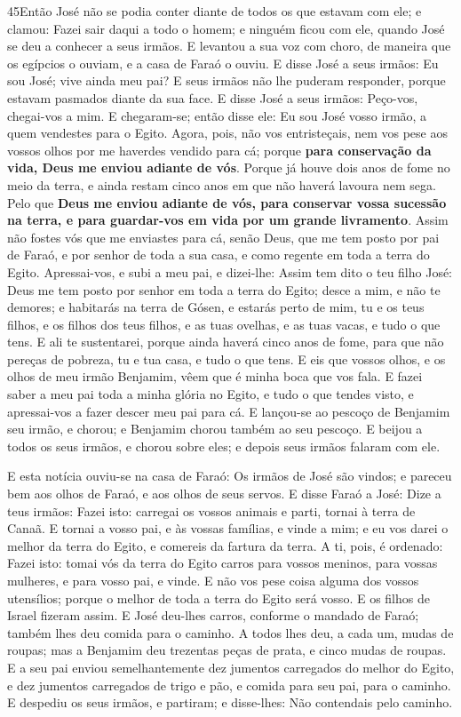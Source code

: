 \lettrine{45} Então José não se podia conter diante de todos
os que estavam com ele; e clamou: Fazei sair daqui a todo o homem; e
ninguém ficou com ele, quando José se deu a conhecer a seus irmãos.
E levantou a sua voz com choro, de maneira que os egípcios o
ouviam, e a casa de Faraó o ouviu. E disse José a seus irmãos:
Eu sou José; vive ainda meu pai? E seus irmãos não lhe puderam
responder, porque estavam pasmados diante da sua face. E disse
José a seus irmãos: Peço-vos, chegai-vos a mim. E chegaram-se; então
disse ele: Eu sou José vosso irmão, a quem vendestes para o Egito.
Agora, pois, não vos entristeçais, nem vos pese aos vossos olhos
por me haverdes vendido para cá; porque \textbf{para conservação da
vida, Deus me enviou adiante de vós}. Porque já houve dois anos
de fome no meio da terra, e ainda restam cinco anos em que não
haverá lavoura nem sega. Pelo que \textbf{Deus me enviou adiante
de vós, para conservar vossa sucessão na terra, e para guardar-vos
em vida por um grande livramento}. Assim não fostes vós que me
enviastes para cá, senão Deus, que me tem posto por pai de Faraó, e
por senhor de toda a sua casa, e como regente em toda a terra do
Egito. Apressai-vos, e subi a meu pai, e dizei-lhe: Assim tem
dito o teu filho José: Deus me tem posto por senhor em toda a terra
do Egito; desce a mim, e não te demores; e habitarás na terra
de Gósen, e estarás perto de mim, tu e os teus filhos, e os filhos
dos teus filhos, e as tuas ovelhas, e as tuas vacas, e tudo o que
tens. E ali te sustentarei, porque ainda haverá cinco anos de
fome, para que não pereças de pobreza, tu e tua casa, e tudo o que
tens. E eis que vossos olhos, e os olhos de meu irmão
Benjamim, vêem que é minha boca que vos fala. E fazei saber a
meu pai toda a minha glória no Egito, e tudo o que tendes visto, e
apressai-vos a fazer descer meu pai para cá. E lançou-se ao
pescoço de Benjamim seu irmão, e chorou; e Benjamim chorou também ao
seu pescoço. E beijou a todos os seus irmãos, e chorou sobre
eles; e depois seus irmãos falaram com ele.

E esta notícia ouviu-se na casa de Faraó: Os irmãos de José são
vindos; e pareceu bem aos olhos de Faraó, e aos olhos de seus
servos. E disse Faraó a José: Dize a teus irmãos: Fazei isto:
carregai os vossos animais e parti, tornai à terra de Canaã.
E tornai a vosso pai, e às vossas famílias, e vinde a mim; e
eu vos darei o melhor da terra do Egito, e comereis da fartura da
terra. A ti, pois, é ordenado: Fazei isto: tomai vós da terra
do Egito carros para vossos meninos, para vossas mulheres, e para
vosso pai, e vinde. E não vos pese coisa alguma dos vossos
utensílios; porque o melhor de toda a terra do Egito será vosso.
E os filhos de Israel fizeram assim. E José deu-lhes carros,
conforme o mandado de Faraó; também lhes deu comida para o caminho.
A todos lhes deu, a cada um, mudas de roupas; mas a Benjamim
deu trezentas peças de prata, e cinco mudas de roupas. E a
seu pai enviou semelhantemente dez jumentos carregados do melhor do
Egito, e dez jumentos carregados de trigo e pão, e comida para seu
pai, para o caminho. E despediu os seus irmãos, e partiram; e
disse-lhes: Não contendais pelo caminho.

